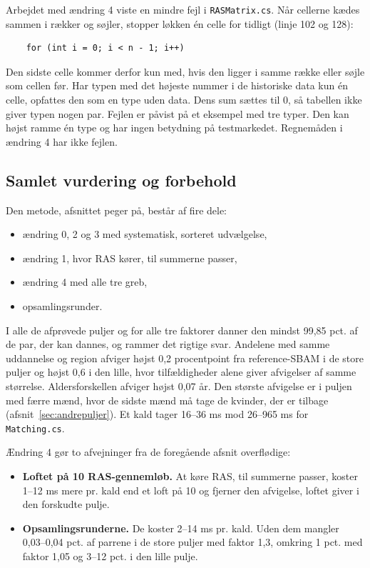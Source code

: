 \documentclass[11pt,a4paper]{article}
\newcommand{\kode}[1]{\texttt{#1}}
\begin{document}
Arbejdet med ændring 4 viste en mindre fejl i \kode{RASMatrix.cs}. Når cellerne kædes sammen i
rækker og søjler, stopper løkken én celle for tidligt (linje 102 og 128):

{\small
\begin{verbatim}
    for (int i = 0; i < n - 1; i++)
\end{verbatim}
}

Den sidste celle kommer derfor kun med, hvis den ligger i samme række eller søjle som cellen før. Har typen med
det højeste nummer i de historiske data kun én celle, opfattes den som en type uden data. Dens sum
sættes til 0, så tabellen ikke giver typen nogen par. Fejlen er påvist på et eksempel med tre typer.
Den kan højst ramme én type og har ingen betydning på testmarkedet. Regnemåden i ændring 4 har ikke
fejlen.

\subsection{Samlet vurdering og forbehold}\label{sec:nyforbehold}

Den metode, afsnittet peger på, består af fire dele:

\begin{itemize}
\item ændring 0, 2 og 3 med systematisk, sorteret udvælgelse,
\item ændring 1, hvor RAS kører, til summerne passer,
\item ændring 4 med alle tre greb,
\item opsamlingsrunder.
\end{itemize}

I alle de afprøvede puljer og for alle tre faktorer danner den mindst 99,85 pct. af de par, der kan
dannes, og rammer det rigtige svar. Andelene med samme uddannelse og region afviger højst 0,2
procentpoint fra reference-SBAM i de store puljer og højst 0,6 i den lille, hvor tilfældigheder
alene giver afvigelser af samme størrelse. Aldersforskellen afviger højst 0,07 år. Den største
afvigelse er i puljen med færre mænd, hvor de sidste mænd må tage de kvinder, der er tilbage
(afsnit~\ref{sec:andrepuljer}). Et kald tager 16--36 ms mod 26--965 ms for \kode{Matching.cs}.

Ændring 4 gør to afvejninger fra de foregående afsnit overflødige:

\begin{itemize}
\item \textbf{Loftet på 10 RAS-gennemløb.} At køre RAS, til summerne passer, koster 1--12 ms mere pr.
kald end et loft på 10 og fjerner den afvigelse, loftet giver i den forskudte pulje.
\item \textbf{Opsamlingsrunderne.} De koster 2--14 ms pr. kald. Uden dem mangler 0,03--0,04 pct. af
parrene i de store puljer med faktor 1,3, omkring 1 pct. med faktor 1,05 og 3--12 pct. i den lille
pulje.
\end{itemize}
\end{document}
